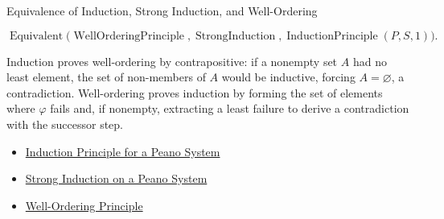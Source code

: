\begin{topicbox}{Equivalence of Induction, Strong Induction, and Well-Ordering}
\begin{remark*}
\[
\operatorname{Equivalent}
\bigl(\operatorname{WellOrderingPrinciple},
\operatorname{StrongInduction},
\operatorname{InductionPrinciple}(P,S,1)\bigr).
\]
\end{remark*}

\begin{remark*}[Interpretation]
Induction proves well-ordering by contrapositive: if a nonempty set $A$ had
no least element, the set of non-members of $A$ would be inductive, forcing
$A = \varnothing$, a contradiction. Well-ordering proves induction by forming
the set of elements where $\varphi$ fails and, if nonempty, extracting a
least failure to derive a contradiction with the successor step.
\end{remark*}

\begin{dependencies}
\begin{itemize}
  \item \hyperref[thm:induction-principle-for-peano-system]{Induction Principle for a Peano System}
  \item \hyperref[thm:strong-induction-on-peano-system]{Strong Induction on a Peano System}
  \item \hyperref[thm:well-ordering-principle]{Well-Ordering Principle}
\end{itemize}
\end{dependencies}
\end{topicbox}

